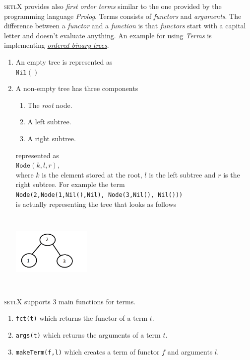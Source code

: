 \documentclass[11pt]{article}
\begin{document}
\textsc{setlX} provides also \textsl{first order terms} similar to the one provided by the programming language \textsl{Prolog}. Terms consists of \textsl{functors} and \textsl{arguments}. The difference between a \textsl{functor} and a \textsl{function} is that \textsl{functors} start with a capital letter and doesn't evaluate anything. An example for using \textsl{Terms} is implementing \href{http://en.wikipedia.org/wiki/Binary_search_tree}{\emph{ordered binary trees}}.
\begin{enumerate}
\item An empty tree is represented as
      \\[0.2cm]
      \hspace*{1.3cm}
      $\mathtt{Nil()}$
      \\[0.2cm]
\item A non-empty tree has three components
      \begin{enumerate}
      \item The \emph{root} node.
      \item A left subtree.
      \item A right subtree.
      \end{enumerate}
represented as 
	  \\[0.2cm]
      \hspace*{1.3cm}
      $\texttt{Node}(k, l, r)$,
      \\[0.2cm]
where $k$ is the element stored at the root, $l$ is the left subtree and $r$ is the right subtree. For example the term
\\[0.2cm]
\hspace*{1.3cm}
\texttt{Node(2,Node(1,Nil(),Nil), Node(3,Nil(), Nil()))}
\\[0.2cm]
is actually representing the tree that looks as follows
\begin{center} \includegraphics[width=1.5in, height=1.5in, scale=1, angle=0]{binary-tree.png} \end{center}
\end{enumerate}
\textsc{setlX} supports 3 main functions for terms.
\begin{enumerate}
\item \texttt{fct(t)} which returns the functor of a term $t$.
\item \texttt{args(t)} which returns the arguments of a term $t$.
\item \texttt{makeTerm(f,l)} which creates a term of functor $f$ and arguments $l$.
\end{enumerate}
\end{document}
